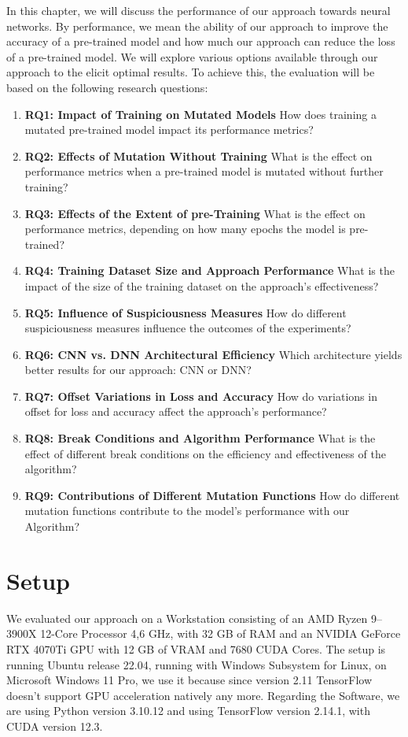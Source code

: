 In this chapter, we will discuss the performance of our approach towards neural networks.
By performance, we mean the ability of our approach to improve the accuracy of a pre-trained model and how much our approach can reduce the loss of a pre-trained model.
We will explore various options available through our approach to the elicit optimal results.
To achieve this, the evaluation will be based on the following research questions:
\begin{enumerate}
    \item[]\textbf{RQ1: Impact of Training on Mutated Models} How does training a mutated pre-trained model impact its performance metrics?
    \item[]\textbf{RQ2: Effects of Mutation Without Training} What is the effect on performance metrics when a pre-trained model is mutated without further training?
    \item[]\textbf{RQ3: Effects of the Extent of pre-Training} What is the effect on performance metrics, depending on how many epochs the model is pre-trained?
    \item[]\textbf{RQ4: Training Dataset Size and Approach Performance} What is the impact of the size of the training dataset on the approach's effectiveness?
    \item[]\textbf{RQ5: Influence of Suspiciousness Measures} How do different suspiciousness measures influence the outcomes of the experiments?
    \item[]\textbf{RQ6: CNN vs. DNN Architectural Efficiency} Which architecture yields better results for our approach: CNN or DNN?
    \item[]\textbf{RQ7: Offset Variations in Loss and Accuracy} How do variations in offset for loss and accuracy affect the approach's performance?
    \item[]\textbf{RQ8: Break Conditions and Algorithm Performance} What is the effect of different break conditions on the efficiency and effectiveness of the algorithm?
    \item[]\textbf{RQ9: Contributions of Different Mutation Functions} How do different mutation functions contribute to the model's performance with our Algorithm?
\end{enumerate}
\section{Setup}\label{sec:setup}

We evaluated our approach on a Workstation consisting of an AMD Ryzen 9--3900X 12-Core Processor 4,6 GHz, with 32 GB of RAM and an NVIDIA GeForce RTX 4070Ti GPU with 12 GB of VRAM and 7680 CUDA Cores.
The setup is running Ubuntu release 22.04, running with Windows Subsystem for Linux, on Microsoft Windows 11 Pro, we use it because since version 2.11\cite{noauthor_build_2023} TensorFlow doesn't support GPU acceleration natively any more.
Regarding the Software, we are using Python version 3.10.12 and using TensorFlow version 2.14.1, with CUDA version 12.3.

